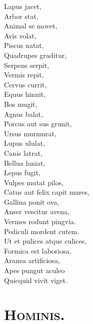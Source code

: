 \documentclass[12pt, twocolumn]{memoir}
\begin{document}
Lapus jacet,\\
Arbor stat,\\
Animal se movet,\\
Avis volat,\\
Piscus natat,\\
Quadrupes graditur,\\
Serpens serpit,\\
Vermis repit,\\
Cervus currit,\\
Equus hinnit,\\
Bos mugit,\\
Agnus balat,\\
Porcus aut sus grunit,\\
Ursus murmurat,\\
Lupus ululat,\\
Canis latrat,\\
Bellua laniat,\\
Lepus fugit,\\
Vulpes mutat pilos,\\
Catus aut felix capit mures,\\
Gallina ponit ova,\\
Anser vescitur avena,\\
Vermes rodunt pingvia.\\
Pediculi mordent cutem.\\
Ut et pulices atque culices,\\
Formica est laboriosa,\\
Aranea artificiosa,\\
Apes pungut aculeo \\
Quicquid vivit viget.\\

\section*{\textsc{Hominis.}}
\end{document}
